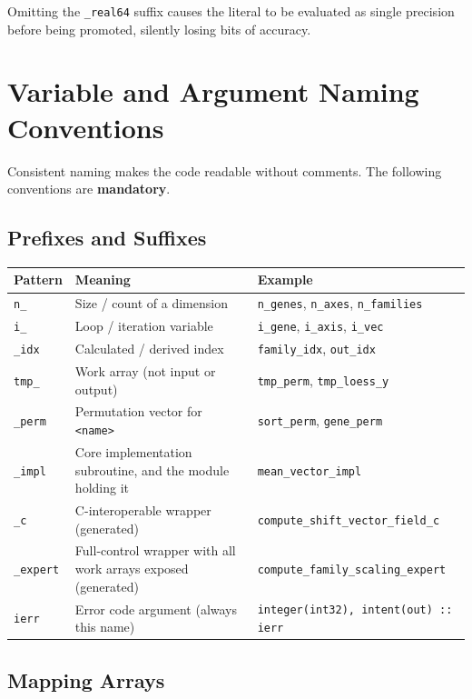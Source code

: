 \documentclass{article}
\begin{document}
Omitting the \texttt{\_real64} suffix causes the literal to be evaluated as single precision before being promoted, silently losing bits of accuracy.

\section{Variable and Argument Naming Conventions}

Consistent naming makes the code readable without comments. The following conventions are \textbf{mandatory}.

\subsection{Prefixes and Suffixes}

\begin{tabular}{lll}
\toprule
Pattern & Meaning & Example \\
\midrule
\texttt{n\_} & Size / count of a dimension & \texttt{n\_genes}, \texttt{n\_axes}, \texttt{n\_families} \\
\texttt{i\_} & Loop / iteration variable & \texttt{i\_gene}, \texttt{i\_axis}, \texttt{i\_vec} \\
\texttt{\_idx} & Calculated / derived index & \texttt{family\_idx}, \texttt{out\_idx} \\
\texttt{tmp\_} & Work array (not input or output) & \texttt{tmp\_perm}, \texttt{tmp\_loess\_y} \\
\texttt{\_perm} & Permutation vector for \texttt{<name>} & \texttt{sort\_perm}, \texttt{gene\_perm} \\
\texttt{\_impl} & Core implementation subroutine, and the module holding it & \texttt{mean\_vector\_impl} \\
\texttt{\_c} & C-interoperable wrapper (generated) & \texttt{compute\_shift\_vector\_field\_c} \\
\texttt{\_expert} & Full-control wrapper with all work arrays exposed (generated) & \texttt{compute\_family\_scaling\_expert} \\
\texttt{ierr} & Error code argument (always this name) & \texttt{integer(int32), intent(out) :: ierr} \\
\bottomrule
\end{tabular}

\subsection{Mapping Arrays}
\end{document}
